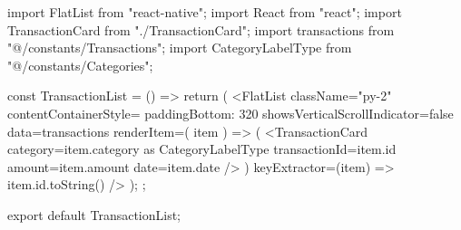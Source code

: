 
import { FlatList } from "react-native";
import React from "react";
import TransactionCard from "./TransactionCard";
import { transactions } from "@/constants/Transactions";
import { CategoryLabelType } from "@/constants/Categories";

const TransactionList = () => {
  return (
    <FlatList
      className="py-2"
      contentContainerStyle={{ paddingBottom: 320 }}
      showsVerticalScrollIndicator={false}
      data={transactions}
      renderItem={({ item }) => (
        <TransactionCard
          category={item.category as CategoryLabelType}
          transactionId={item.id}
          amount={item.amount}
          date={item.date}
        />
      )}
      keyExtractor={(item) => item.id.toString()}
    />
  );
};

export default TransactionList;
